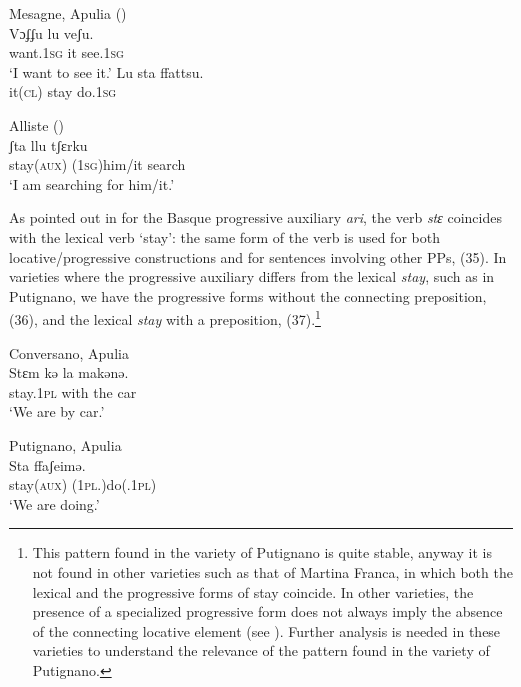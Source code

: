 \documentclass[output=paper]{langsci/langscibook}
\begin{document}
\ea%
    \label{ex:lorusso:33}
    \ea  Mesagne, Apulia (\citealt{Manzini2005})\\
    \gll Vɔʄʄu     lu  veʃu.      \\
         want.\textsc{1sg} it   see.\textsc{1sg}\\
    \glt ‘I want to see it.’ 
    \ex 
    \gll Lu   sta   ffattsu.\\
         it\textsc{(cl)}  stay  do.\textsc{1sg}\\
    \z
\z

\ea%
         Alliste (\citealt{Manzini2005})\label{ex:lorusso:34}\\
    \gll ʃta     llu     tʃɛrku    \\
         stay\textsc{(aux)} (\textsc{1sg})him/it  search\\
    \glt ‘I am searching for him/it.’ 
\z

As pointed out in \citet{Laka2006} for the Basque progressive auxiliary \textit{ari}, the verb \textit{stɛ} coincides with the lexical verb ‘stay’: the same form of the verb is used for both locative\slash progressive constructions and for sentences involving other PPs, (35). In varieties where the progressive auxiliary differs from the lexical \textit{stay}, such as in Putignano, we have the progressive forms without the connecting preposition, (36), and the lexical \textit{stay} with a preposition, (37).\footnote{This pattern found in the variety of Putignano is quite stable, anyway it is not found in other varieties such as that of Martina Franca, in which both the lexical and the progressive forms of stay coincide. In other varieties, the presence of a specialized progressive form does not always imply the absence of the connecting locative element (see \citealt{Manzini2017}). Further analysis is needed in these varieties to understand the relevance of the pattern found in the variety of Putignano.}

\ea%
         Conversano, Apulia\label{ex:lorusso:35}\\
    \gll Stɛm     kə  la   makənə.       \\
         stay.\textsc{1pl} with   the  car \\
    \glt ‘We are by car.’
\z

\ea%
         Putignano, Apulia\label{ex:lorusso:36}\\
    \gll Sta     ffaʃeimə.\\
         stay\textsc{(aux)}   (\textsc{1pl.})do(.\textsc{1pl})        \\
    \glt ‘We are doing.’
    \z
\end{document}
